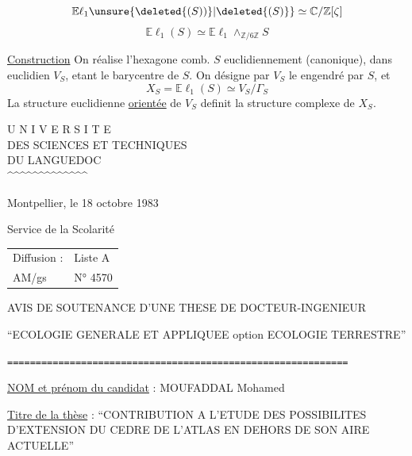  
\[
\mathbb E\ell_1\unsure{\deleted{(S))}|\deleted{(S)}}\simeq\mathbb C/\mathbb Z[\zeta]
\]
\[
\mathbb E\ell_1(S)\simeq\mathbb E\ell_1\mathbin{\wedge}_{\mathbb Z/6\mathbb Z}S
\]

\uline{Construction} On réalise l'hexagone comb. $S$ euclidiennement (canonique), dans  euclidien $V_S$,   etant le barycentre de $S$. On désigne par $V_S$ le   engendré par $S$, et
\[
X_S=\mathbb E\ell_1(S)\simeq V_S/\Gamma_S
\]
La structure euclidienne \uline{orientée} de $V_S$ definit la structure complexe de $X_S$.



\noindent
\begin{minipage}[t]{0.44\linewidth}
\centering
U N I V E R S I T E\\
DES SCIENCES ET TECHNIQUES\\
DU LANGUEDOC\\
\textasciicircum\textasciicircum\textasciicircum\textasciicircum\textasciicircum\textasciicircum\textasciicircum\textasciicircum\textasciicircum\textasciicircum\textasciicircum\textasciicircum\textasciicircum
\end{minipage}\hfill
\begin{minipage}[t]{0.53\linewidth}
\raggedleft
\vspace{\baselineskip}
Montpellier, le 18 octobre 1983
\end{minipage}

Service de la Scolarité

\begin{tabular}{@{}ll@{}}
Diffusion : & Liste A\\
AM/gs & N° 4570
\end{tabular}

\begin{center}
AVIS DE SOUTENANCE D'UNE THESE DE DOCTEUR-INGENIEUR

``ECOLOGIE GENERALE ET APPLIQUEE option ECOLOGIE TERRESTRE''

\texttt{============================================================}
\end{center}

\uline{NOM et prénom du candidat} : MOUFADDAL Mohamed

\uline{Titre de la thèse} : ``CONTRIBUTION A L'ETUDE DES POSSIBILITES D'EXTENSION DU CEDRE DE L'ATLAS EN DEHORS DE SON AIRE ACTUELLE''

